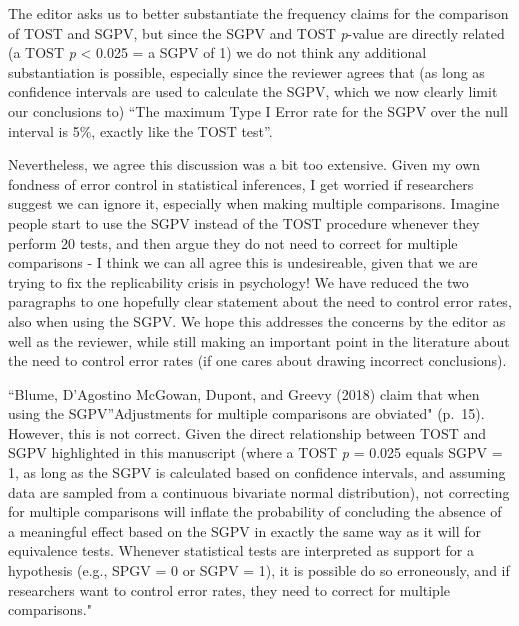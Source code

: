\documentclass[man]{apa6}
\begin{document}
\begin{enumerate}
\end{enumerate}

The editor asks us to better substantiate the frequency claims for the comparison of TOST and SGPV, but since the SGPV and TOST \emph{p}-value are directly related (a TOST \emph{p} \textless{} 0.025 = a SGPV of 1) we do not think any additional substantiation is possible, especially since the reviewer agrees that (as long as confidence intervals are used to calculate the SGPV, which we now clearly limit our conclusions to) \enquote{The maximum Type I Error rate for the SGPV over the null interval is 5\%, exactly like the TOST test}.

Nevertheless, we agree this discussion was a bit too extensive. Given my own fondness of error control in statistical inferences, I get worried if researchers suggest we can ignore it, especially when making multiple comparisons. Imagine people start to use the SGPV instead of the TOST procedure whenever they perform 20 tests, and then argue they do not need to correct for multiple comparisons - I think we can all agree this is undesireable, given that we are trying to fix the replicability crisis in psychology! We have reduced the two paragraphs to one hopefully clear statement about the need to control error rates, also when using the SGPV. We hope this addresses the concerns by the editor as well as the reviewer, while still making an important point in the literature about the need to control error rates (if one cares about drawing incorrect conclusions).

\enquote{Blume, D'Agostino McGowan, Dupont, and Greevy (2018) claim that when using the SGPV}Adjustments for multiple comparisons are obviated" (p.~15). However, this is not correct. Given the direct relationship between TOST and SGPV highlighted in this manuscript (where a TOST \emph{p} = 0.025 equals SGPV = 1, as long as the SGPV is calculated based on confidence intervals, and assuming data are sampled from a continuous bivariate normal distribution), not correcting for multiple comparisons will inflate the probability of concluding the absence of a meaningful effect based on the SGPV in exactly the same way as it will for equivalence tests. Whenever statistical tests are interpreted as support for a hypothesis (e.g., SPGV = 0 or SGPV = 1), it is possible do so erroneously, and if researchers want to control error rates, they need to correct for multiple comparisons."
\end{document}
